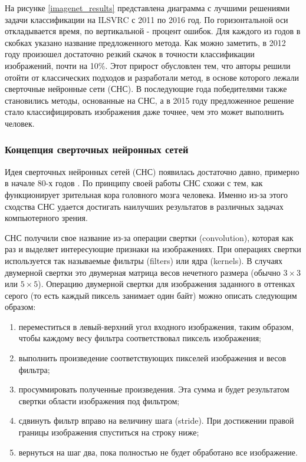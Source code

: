 На рисунке \ref{imagenet_results} представлена диаграмма с лучшими решениями задачи классификации на ILSVRC с 2011 
по 2016 год. По горизонтальной оси откладывается время, по вертикальной - процент ошибок. Для каждого из годов в скобках
указано название предложенного метода. Как можно заметить, в 2012 году произошел достаточно резкий скачок в точности 
классификации изображений, почти на 10\%. Этот прирост обусловлен тем, что авторы решили отойти от классических подходов 
и разработали метод, в основе которого лежали сверточные нейронные сети (СНС). В последующие года победителями также 
становились методы, основанные на СНС, а в 2015 году предложенное решение стало классифицировать изображения даже 
точнее, чем это может выполнить человек.


\subsubsection{Концепция сверточных нейронных сетей}
Идея сверточных нейронных сетей (СНС) появилась достаточно давно, примерно в начале 80-х годов \cite{DIVE_INTO_DL}.
По принципу своей работы СНС схожи с тем, как функционирует зрительная кора головного мозга человека. Именно из-за этого
сходства СНС удается достигать наилучших результатов в различных задачах компьютерного зрения.

СНС получили свое название из-за операции свертки (convolution), которая как раз и выделяет интересующие признаки
на изображениях. При операциях свертки используется так называемые фильтры (filters) или ядра (kernels). В случаях 
двумерной свертки это двумерная матрица весов нечетного размера (обычно $3 \times 3$ или $5 \times 5$). Операцию 
двумерной свертки для изображения заданного в оттенках серого (то есть каждый пиксель занимает один байт) 
можно описать следующим образом:

\begin{enumerate}
\item переместиться в левый-верхний угол входного изображения, таким образом, чтобы каждому весу фильтра соответствовал
пиксель изображения;
\item выполнить произведение соответствующих пикселей изображения и весов фильтра;
\item просуммировать полученные произведения. Эта сумма и будет результатом свертки области изображения под фильтром;
\item сдвинуть фильтр вправо на величину шага (stride). При достижении правой границы изображения спуститься
на строку ниже;
\item вернуться на шаг два, пока полностью не будет обработано все изображение.
\end{enumerate}


